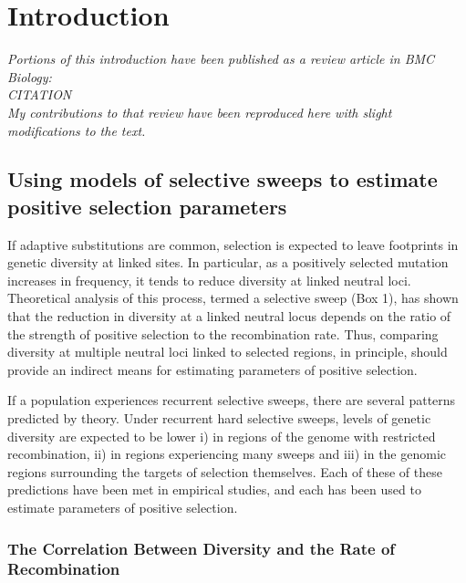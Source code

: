 \chapter{Introduction}

\emph{Portions of this introduction have been published as a review article in BMC Biology: \\CITATION\\My contributions to that review have been reproduced here with slight modifications to the text.}

\section{Using models of selective sweeps to estimate positive selection parameters}
 
If adaptive substitutions are common, selection is expected to leave footprints in genetic diversity at linked sites. In particular, as a positively selected mutation increases in frequency, it tends to reduce diversity at linked neutral loci. Theoretical analysis of this process, termed a selective sweep (Box 1), has shown that the reduction in diversity at a linked neutral locus depends on the ratio of the strength of positive selection to the recombination rate. Thus, comparing diversity at multiple neutral loci linked to selected regions, in principle, should provide an indirect means for estimating parameters of positive selection.
 

If a population experiences recurrent selective sweeps, there are several patterns predicted by theory. Under recurrent hard selective sweeps, levels of genetic diversity are expected to be lower i) in regions of the genome with restricted recombination, ii) in regions experiencing many sweeps and iii) in the genomic regions surrounding the targets of selection themselves. Each of these of these predictions have been met in empirical studies, and each has been used to estimate parameters of positive selection.


\subsection{The Correlation Between Diversity and the Rate of Recombination}

